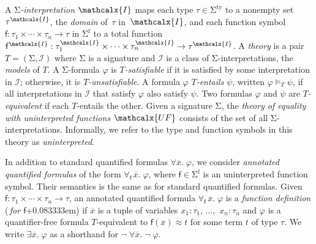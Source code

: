 \documentclass[runningheads,a4paper]{llncs}
\renewcommand\models{\mathrel{\vDash}}
\newcommand{\con}[1]{\mathsf{#1}}
\let\const=\con
\renewcommand\vec[1]{\overline{#1}}
\let\oldSigma=\Sigma
\def\Sigma{\mathrm{\oldSigma}}
\let\oldneg=\neg
\def\neg{\oldneg\;}
\newcommand{\teq}{\approx}
\newcommand{\I}{\mathcalx{I}}
\newcommand{\stypes}[1]{#1^\mathrm{ty}}
\newcommand{\sfuns}[1]{#1^\mathrm{f}}
\newcommand{\sfundefs}[1]{#1^\mathrm{dfn}}
\newcommand{\forallf}[1]{\forall_{\!#1\:}}
\newcommand{\rem}[1]{\textcolor{red}{[#1]}}
\newcommand{\ct}[1]{\rem{#1 --ct}}
\newcommand{\vthinspace}{\kern+0.083333em}
\newcommand{\Mo}{{\mathcal{I}}}
\newcommand{\euf}{\ensuremath{\mathcalx{UF}}\xspace}
\begin{document}

A \emph{$\Sigma$-interpretation $\I$} %
maps each type $\tau \in \stypes{\Sigma}$ to a nonempty set $\tau^\I$,
the \emph{domain} of~$\tau$ in~$\I$,
and each function symbol $\con{f} : \tau_1 \times \cdots \times \tau_n \rightarrow \tau$ in
$\sfuns{\Sigma}$
to a total function $\con{f}^\I : \tau_1^\I \times \cdots \times \tau_n^\I \rightarrow \tau^\I$.
A \emph{theory} is a pair $T = (\Sigma, \Mo)$ where
$\Sigma$ is a signature and $\Mo$ is a class of $\Sigma$-interpretations,
the \emph{models} of $T$.
A $\Sigma$-formula $\varphi$ is
\emph{$T$-satisfiable}
if it is satisfied by some interpretation in $\Mo$;
otherwise, it is \emph{$T$-unsatisfiable}.
A formula $\varphi$ \emph{$T$-entails} $\psi$, written $\varphi \models_T \psi$,
if all interpretations in $\Mo$ that satisfy $\varphi$ also satisfy $\psi$.
Two formulas $\varphi$ and $\psi$ are \emph{$T$-equivalent} 
if each $T$-entails the other.
Given a signature $\Sigma$,
the \emph{theory of equality with uninterpreted functions} \euf
consists of the set of all $\Sigma$-interpretations.
Informally, we refer to the type and function symbols in this theory as \emph{uninterpreted}.

In addition to standard quantified formulas $\forall \vec x.\; \varphi$,
we consider \emph{annotated quantified formulas} of the form
$\forallf{\const{f}} \vec x.\; \varphi$, where $\con{f} \in \sfuns{\Sigma}$ is
an uninterpreted function symbol. Their
semantics is the same as for standard quantified formulas.
Given $\con{f} : \tau_1 \times \cdots \times \tau_n \rightarrow \tau$,
an annotated
quantified formula $\forallf{\con{f}} \vec x.\; \varphi$ is a \emph{function definition}
(\,\emph{for $\con{f}$}\vthinspace) if $\vec x$ is a tuple of variables
$x_1 : \tau_1$, $\ldots,$ $x_n : \tau_n$
and $\varphi$ is a quantifier-free formula 
$T$-equivalent to $\con{f}( \vec x ) \teq t$ for some term $t$ of type $\tau$.
We write $\exists
\vec x.\; \varphi$ as a shorthand for $\neg \forall \vec x.\; \neg \varphi$.
\end{document}
